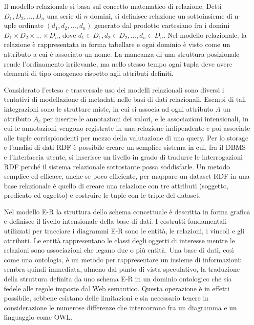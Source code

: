 \documentclass[Lau,binding=0.6cm,noexaminfo]{sapthesis}
\begin{document}
Il modello relazionale si basa sul concetto matematico di relazione. Detti $D_1, D_2, ..., D_n$ una serie di $n$ domini, si definisce relazione un sottoinsieme di n-uple ordinate $(d_1, d_2, ..., d_n)$ generato dal prodotto cartesiano fra i domini $D_1 \times D_2 \times ... \times D_n$, dove $d_1 \! \in \! D_1, d_2 \! \in \! D_2, ..., d_n \! \in \! D_n$.
Nel modello relazionale, la relazione è rappresentata in forma tabellare e ogni dominio è visto come un attributo a cui è associato un nome. La mancanza di una struttura posizionale rende l'ordinamento irrilevante, ma nello stesso tempo ogni tupla deve avere elementi di tipo omogeneo rispetto agli attributi definiti.\medskip

Considerato l'esteso e trasversale uso dei modelli relazionali sono diversi i tentativi di modellazione di metadati nelle basi di dati relazionali. Esempi di tali integrazioni sono le strutture miste, in cui si associa ad ogni attributo $A$ un attributo $A_c$ per inserire le annotazioni dei valori, e le associazioni intensionali, in cui le annotazioni vengono registrate in una relazione indipendente e poi associate alle tuple corrispiondenti per mezzo della valutazione di una query.
Per lo storage e l'analisi di dati RDF è possibile creare un semplice sistema in cui, fra il DBMS e l'interfaccia utente, si inserisce un livello in grado di tradurre le interrogazioni RDF perché il sistema relazionale sottostante possa soddisfarle. Un metodo semplice ed efficace, anche se poco efficiente, per mappare un dataset RDF in una base relazionale è quello di creare una relazione con tre attributi (soggetto, predicato ed oggetto) e costruire le tuple con le triple del dataset.\medskip

Nel modello E-R la struttura dello schema concettuale è descritta in forma grafica e definisce il livello intensionale della base di dati. I costrutti fondamentali utilizzati per tracciare i diagrammi E-R sono le entità, le relazioni, i vincoli e gli attributi. Le entità rappresentano le classi degli oggetti di interesse mentre le relazioni sono associazioni che legano due o più entità. Una base di dati, così come una ontologia, è un metodo per rappresentare un insieme di informazioni: sembra quindi immediata, almeno dal punto di vista speculativo, la traduzione della struttura definita da uno schema E-R in un dominio ontologico che sia fedele alle regole imposte dal Web semantico. Questa operazione è in effetti possibile, sebbene esistano delle limitazioni e sia necessario tenere in considerazione le numerose differenze che intercorrono fra un diagramma e un linguaggio come OWL.\medskip
\end{document}
